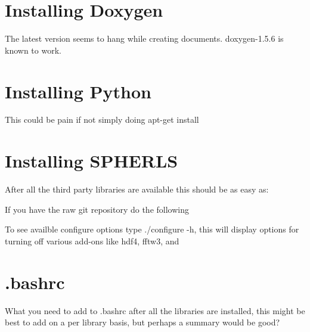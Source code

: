 \documentclass[12pt,a4paper]{book}
\begin{document}
\section{Installing Doxygen}
The latest version seems to hang while creating documents. doxygen-1.5.6 is known to work.

\section{Installing Python}
This could be pain if not simply doing apt-get install

\section{Installing SPHERLS}
After all the third party libraries are available this should be as easy as:
If you have the raw git repository do the following
To see availble configure options type ./configure -h, this will display options for turning off various add-ons like hdf4, fftw3, and

\section{.bashrc}
What you need to add to .bashrc after all the libraries are installed, this might be best to add on a per library basis, but perhaps a summary would be good?
\end{document}
